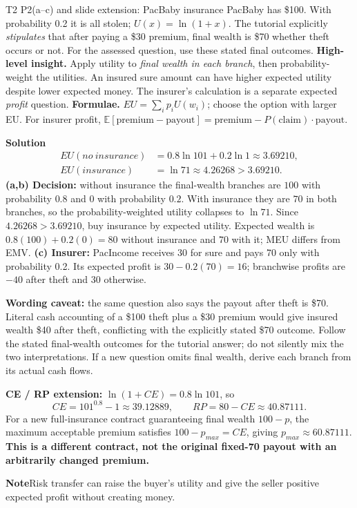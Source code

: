 \documentclass[10pt,a4paper]{article}
\newcommand{\ans}{\par\smallskip\textbf{\color{good}Solution\quad}}
\newcommand{\pit}{\par\smallskip\textbf{\color{warn}Note\quad}}
\newcommand{\E}{\mathbb E}
\begin{document}
\begin{question}{T2 P2(a--c) and slide extension: PacBaby insurance}\label{q:t2p2}
PacBaby has \$100. With probability 0.2 it is all stolen; $U(x)=\ln(1+x)$. The tutorial explicitly \emph{stipulates} that after paying a \$30 premium, final wealth is \$70 whether theft occurs or not. For the assessed question, use these stated final outcomes.
\textbf{High-level insight.} Apply utility to \emph{final wealth in each branch}, then probability-weight the utilities. An insured sure amount can have higher expected utility despite lower expected money. The insurer's calculation is a separate expected \emph{profit} question.
\textbf{Formulae.} $EU=\sum_i p_iU(w_i)$; choose the option with larger EU. For insurer profit, $\E[\text{premium}-\text{payout}]=\text{premium}-P(\text{claim})\cdot\text{payout}$.
\ans
\[
\begin{aligned}
EU(no\ insurance)&=0.8\ln101+0.2\ln1\approx3.69210,\\
EU(insurance)&=\ln71\approx4.26268>3.69210.
\end{aligned}
\]
\textbf{(a,b) Decision:} without insurance the final-wealth branches are $100$ with probability $0.8$ and $0$ with probability $0.2$. With insurance they are $70$ in both branches, so the probability-weighted utility collapses to $\ln71$. Since $4.26268>3.69210$, buy insurance by expected utility. Expected wealth is $0.8(100)+0.2(0)=80$ without insurance and $70$ with it; MEU differs from EMV.
\textbf{(c) Insurer:} PacIncome receives 30 for sure and pays 70 only with probability 0.2. Its expected profit is $30-0.2(70)=\boxed{16}$; branchwise profits are $-40$ after theft and $30$ otherwise.

\textbf{Wording caveat:} the same question also says the payout after theft is \$70. Literal cash accounting of a \$100 theft plus a \$30 premium would give insured wealth \$40 after theft, conflicting with the explicitly stated \$70 outcome. Follow the stated final-wealth outcomes for the tutorial answer; do not silently mix the two interpretations. If a new question omits final wealth, derive each branch from its actual cash flows.

\textbf{CE / RP extension:} $\ln(1+CE)=0.8\ln101$, so
\[
CE=101^{0.8}-1\approx39.12889,\qquad RP=80-CE\approx40.87111.
\]
For a new full-insurance contract guaranteeing final wealth $100-p$, the maximum acceptable premium satisfies $100-p_{max}=CE$, giving $p_{max}\approx60.87111$. \textbf{This is a different contract, not the original fixed-70 payout with an arbitrarily changed premium.}
\pit Risk transfer can raise the buyer's utility and give the seller positive expected profit without creating money.
\end{question}
\end{document}
